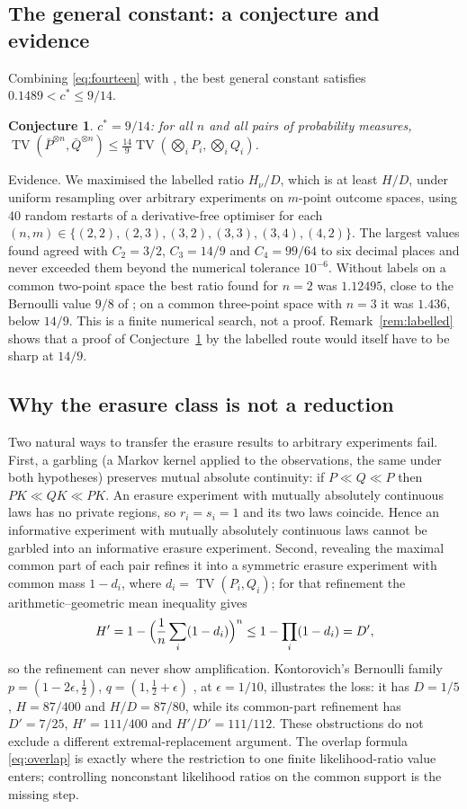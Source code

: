 \documentclass[11pt,a4paper]{article}
\newtheorem{conjecture}[theorem]{Conjecture}
\theoremstyle{definition}\newtheorem{definition}[theorem]{Definition}
\theoremstyle{remark}\newtheorem{remark}[theorem]{Remark}
\newcommand{\TV}{\operatorname{TV}}
\begin{document}
\subsection{The general constant: a conjecture and evidence}
Combining \eqref{eq:fourteen} with \cite{KApr}, the best general constant satisfies $0.1489<c^*\le9/14$.
\begin{conjecture}\label{conj:914}
$c^*=9/14$: for all $n$ and all pairs of probability measures, $\TV(\bar P^{\otimes n},\bar Q^{\otimes n})\le\frac{14}{9}\TV(\bigotimes_iP_i,\bigotimes_iQ_i)$.
\end{conjecture}
Evidence. We maximised the labelled ratio $H_\nu/D$, which is at least $H/D$, under uniform resampling over arbitrary experiments on $m$-point outcome spaces, using 40 random restarts of a derivative-free optimiser for each $(n,m)\in\{(2,2),(2,3),(3,2),(3,3),(3,4),(4,2)\}$. The largest values found agreed with $C_2=3/2$, $C_3=14/9$ and $C_4=99/64$ to six decimal places and never exceeded them beyond the numerical tolerance $10^{-6}$. Without labels on a common two-point space the best ratio found for $n=2$ was $1.12495$, close to the Bernoulli value $9/8$ of \cite{KJan}; on a common three-point space with $n=3$ it was $1.436$, below $14/9$. This is a finite numerical search, not a proof. Remark~\ref{rem:labelled} shows that a proof of Conjecture~\ref{conj:914} by the labelled route would itself have to be sharp at $14/9$.

\subsection{Why the erasure class is not a reduction}
Two natural ways to transfer the erasure results to arbitrary experiments fail. First, a garbling (a Markov kernel applied to the observations, the same under both hypotheses) preserves mutual absolute continuity: if $P\ll Q\ll P$ then $PK\ll QK\ll PK$. An erasure experiment with mutually absolutely continuous laws has no private regions, so $r_i=s_i=1$ and its two laws coincide. Hence an informative experiment with mutually absolutely continuous laws cannot be garbled into an informative erasure experiment. Second, revealing the maximal common part of each pair refines it into a symmetric erasure experiment with common mass $1-d_i$, where $d_i=\TV(P_i,Q_i)$; for that refinement the arithmetic--geometric mean inequality gives
\[
H'=1-\Bigl(\frac1n\sum_i(1-d_i)\Bigr)^n\le1-\prod_i(1-d_i)=D',
\]
so the refinement can never show amplification. Kontorovich's Bernoulli family $p=(1-2\epsilon,\frac12)$, $q=(1,\frac12+\epsilon)$ \cite[remarks after Theorem~1.5]{KJan}, at $\epsilon=1/10$, illustrates the loss: it has $D=1/5$, $H=87/400$ and $H/D=87/80$, while its common-part refinement has $D'=7/25$, $H'=111/400$ and $H'/D'=111/112$. These obstructions do not exclude a different extremal-replacement argument. The overlap formula \eqref{eq:overlap} is exactly where the restriction to one finite likelihood-ratio value enters; controlling nonconstant likelihood ratios on the common support is the missing step.
\end{document}
